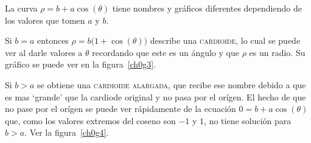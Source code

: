 \documentclass[mid,fleqn,draft,twoside]{notasdeclase}
\begin{document}
\begin{ejem}[cardioides]
	La curva $\rho = b+a\cos(\theta)$ tiene nombres y gráficos diferentes dependiendo de los valores que tomen $a$ y $b$. 
	
	Si $b=a$ entonces $\rho = b\big(1+\cos(\theta)\big)$ describe una \textsc{cardioide}, lo cual se puede ver al darle valores a $\theta$ recordando que este es un ángulo y que $\rho$ es un radio. Su gráfico se puede ver en la figura~\ref{ch0g3}.
	
	Si $b>a$ se obtiene una \textsc{cardioide alargada}, que recibe ese nombre debido a que es mas `grande' que la cardiode original y no pasa por el orígen. El hecho de que no pase por el orígen se puede ver rápidamente de la ecuación $0=b+a\cos(\theta)$ que, como los valores extremos del coseno son $-1$ y $1$, no tiene solución para $b>a$. Ver la figura~\ref{ch0g4}.


\end{ejem}
\end{document}
